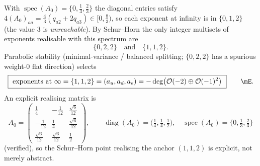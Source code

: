 \begin{theorem}
With $\operatorname{spec}(A_0)=\{0,\tfrac13,\tfrac23\}$ the diagonal entries satisfy
$4(A_0)_{aa}=\tfrac43(q_{a2}+2q_{a3})\in[0,\tfrac83)$, so each exponent at infinity is in $\{0,1,2\}$
(the value $3$ is \emph{unreachable}). By Schur--Horn the only integer multisets of exponents
realisable with this spectrum are
\[
  \{0,2,2\}\quad\text{and}\quad\{1,1,2\}.
\]
Parabolic stability (minimal-variance / balanced splitting; $\{0,2,2\}$ has a spurious weight-$0$ flat
direction) selects
\begin{equation}
  \boxed{\ \text{exponents at }\infty=\{1,1,2\}=(a_u,a_d,a_e)=-\deg\bigl(\mathcal O(-2)\oplus\mathcal O(-1)^2\bigr)\ }\qquad\mE .
\end{equation}
An explicit realising matrix is
\[
  A_0=\begin{pmatrix} \tfrac14 & -\tfrac1{12} & \tfrac{\sqrt6}{12}\\[2pt]
  -\tfrac1{12} & \tfrac14 & \tfrac{\sqrt6}{12}\\[2pt]
  \tfrac{\sqrt6}{12} & \tfrac{\sqrt6}{12} & \tfrac12 \end{pmatrix},\qquad
  \operatorname{diag}(A_0)=\bigl(\tfrac14,\tfrac14,\tfrac12\bigr),\quad \operatorname{spec}(A_0)=\{0,\tfrac13,\tfrac23\}
\]
(verified), so the Schur--Horn point realising the anchor $(1,1,2)$ is explicit, not merely abstract.
\end{theorem}

